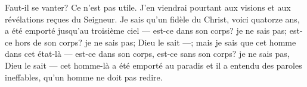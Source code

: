 Faut-il se vanter? Ce n’est pas utile.
J’en viendrai pourtant aux visions et aux révélations reçues du Seigneur.
Je sais qu’un fidèle du Christ, voici quatorze ans,
		a été emporté jusqu’au troisième ciel
	--- est-ce dans son corps? je ne sais pas;
	est-ce hors de son corps? je ne sais pas; Dieu le sait ---;
	mais je sais que cet homme dans cet état-là
	--- est-ce dans son corps, est-ce sans son corps?
	je ne sais pas, Dieu le sait ---
	cet homme-là a été emporté au paradis
	et il a entendu des paroles ineffables,
	qu’un homme ne doit pas redire.
